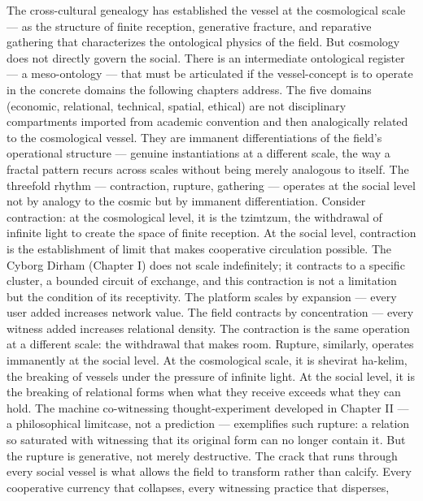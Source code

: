 The cross-cultural genealogy has established the vessel at the cosmological scale — as the structure of finite reception, generative fracture, and reparative gathering that characterizes the ontological physics of the field. But cosmology does not directly govern the social. There is an intermediate ontological register — a meso-ontology — that must be articulated if the vessel-concept is to operate in the concrete domains the following chapters address. The five domains (economic, relational, technical, spatial, ethical) are not disciplinary compartments imported from academic convention and then analogically related to the cosmological vessel. They are immanent differentiations of the field’s operational structure — genuine instantiations at a different scale, the way a fractal pattern recurs across scales without being merely analogous to itself. The threefold rhythm — contraction, rupture, gathering — operates at the social level not by analogy to the cosmic but by immanent differentiation. Consider contraction: at the cosmological level, it is the tzimtzum, the withdrawal of infinite light to create the space of finite reception. At the social level, contraction is the establishment of limit that makes cooperative circulation possible. The Cyborg Dirham (Chapter I) does not scale indefinitely; it contracts to a specific cluster, a bounded circuit of exchange, and this contraction is not a limitation but the condition of its receptivity. The platform scales by expansion — every user added increases network value. The field contracts by concentration — every witness added increases relational density. The contraction is the same operation at a different scale: the withdrawal that makes room. Rupture, similarly, operates immanently at the social level. At the cosmological scale, it is shevirat ha-kelim, the breaking of vessels under the pressure of infinite light. At the social level, it is the breaking of relational forms when what they receive exceeds what they can hold. The machine co-witnessing thought-experiment developed in Chapter II — a philosophical limitcase, not a prediction — exemplifies such rupture: a relation so saturated with witnessing that its original form can no longer contain it. But the rupture is generative, not merely destructive. The crack that runs through every social vessel is what allows the field to transform rather than calcify. Every cooperative currency that collapses, every witnessing practice that disperses,

